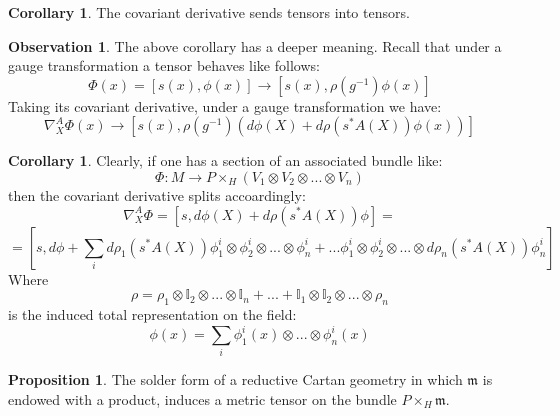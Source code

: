 \documentclass[12pt,a4paper]{report}
\theoremstyle{definition}
\theoremstyle{Theorem}
\newtheorem{Prop}[Def]{Proposition}
\theoremstyle{definition}
\theoremstyle{definition}
\newtheorem{Cor}[Def]{Corollary}
\newtheorem{Obs}[Def]{Observation}
\begin{document}
	\begin{Cor}
		The covariant derivative sends tensors into tensors. 
	\end{Cor}
	\begin{Obs}
		The above corollary has a deeper meaning. Recall that under a gauge transformation a tensor behaves like follows:
		$$\Phi(x)=[s(x),\phi(x)]\longrightarrow[s(x),\rho(g^{-1})\phi(x)]$$
		Taking its covariant derivative, under a gauge transformation we have:
		$$\nabla_X^A\Phi(x)\longrightarrow[s(x),\rho(g^{-1})(d\phi(X)+d\rho(s^*A(X))\phi(x))]$$
	\end{Obs}
	\begin{Cor}
		Clearly, if one has a section of an associated bundle like:
		$$\Phi:M\rightarrow P\times_H(V_1\otimes V_2\otimes...\otimes V_n)$$
		then the covariant derivative splits accoardingly:
		$$\nabla^A_X \Phi=[s,d\phi(X)+d\rho(s^*A(X))\phi]=$$
		$$=[s,d\phi+\sum_i d\rho_1(s^*A(X))\phi^i_1\otimes \phi^i_2\otimes...\otimes \phi^i_n+...\phi^i_1\otimes \phi^i_2\otimes...\otimes d\rho_n(s^*A(X))\phi^i_n]$$
		Where
		$$\rho=\rho_1\otimes \mathbb{I}_2\otimes...\otimes\mathbb{I}_n+...+\mathbb{I}_1\otimes \mathbb{I}_2\otimes...\otimes\rho_n$$
		is the induced total representation on the field:
		$$\phi(x)=\sum_i \phi^i_1(x)\otimes...\otimes \phi^i_n(x)$$
	\end{Cor}
	\begin{Prop}
		The solder form of a reductive Cartan geometry in which $\mathfrak{m}$ is endowed with a product, induces a metric tensor on the bundle $P\times_H\mathfrak{m}$.
	\end{Prop}
\end{document}
